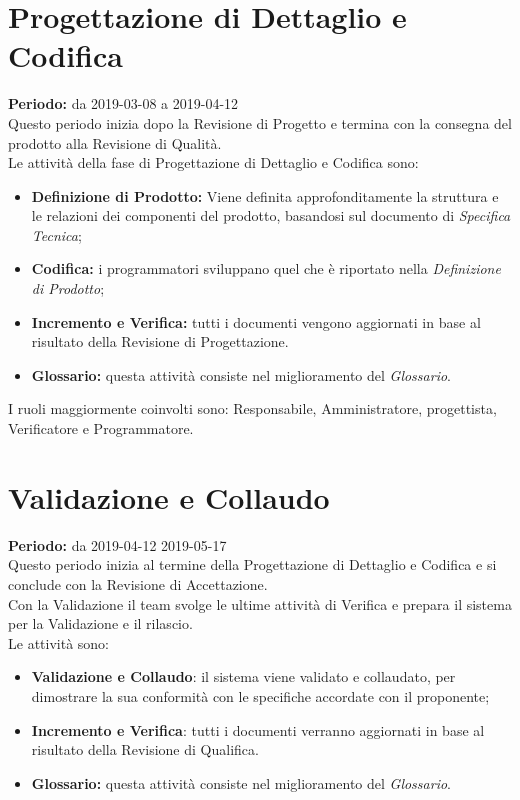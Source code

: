 \section{Progettazione di Dettaglio e Codifica}
\textbf{Periodo:} da 2019-03-08 a 2019-04-12\\
Questo periodo inizia dopo la Revisione di Progetto e termina con la consegna del prodotto alla Revisione di Qualità.\\Le attività della fase di Progettazione di Dettaglio e Codifica sono:
\begin{itemize}
    \item \textbf{Definizione di Prodotto:} Viene definita approfonditamente la struttura e le relazioni dei componenti del prodotto, basandosi sul documento di \textit{Specifica Tecnica};
    \item \textbf{Codifica:} i programmatori sviluppano quel che è riportato nella \textit{Definizione di Prodotto};
    \item \textbf{Incremento e Verifica:} tutti i documenti vengono aggiornati in base al risultato della Revisione di Progettazione.
    \item \textbf{Glossario:} questa attività consiste nel miglioramento del \textit{Glossario}.
\end{itemize}
I ruoli maggiormente coinvolti sono: Responsabile, Amministratore, progettista, Verificatore e Programmatore.

\section{Validazione e Collaudo}
\textbf{Periodo:} da 2019-04-12 2019-05-17\\
Questo periodo inizia al termine della Progettazione di Dettaglio e Codifica e si conclude con la Revisione di Accettazione.\\Con la Validazione il team svolge le ultime attività di Verifica e prepara il sistema per la Validazione e il rilascio.\\
Le attività sono:
\begin{itemize}
    \item \textbf{Validazione e Collaudo}: il sistema viene validato e collaudato, per dimostrare la sua conformità con le specifiche accordate con il proponente;
    \item \textbf{Incremento e Verifica}: tutti i documenti verranno aggiornati in base al risultato della Revisione di Qualifica.
    \item \textbf{Glossario:} questa attività consiste nel miglioramento del \textit{Glossario}.
\end{itemize}
